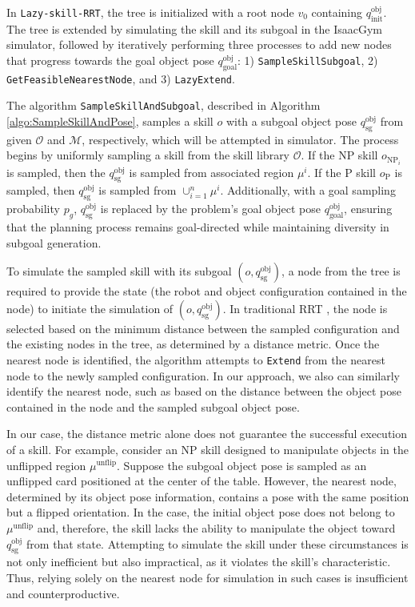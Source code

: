In \texttt{Lazy-skill-RRT}, the tree is initialized with a root node $v_0$ containing $q^\text{obj}_\text{init}$. The tree is extended by simulating the skill and its subgoal in the IsaacGym simulator, followed by iteratively performing three processes to add new nodes that progress towards the goal object pose $q^\text{obj}_\text{goal}$: 1) \texttt{SampleSkillSubgoal}, 2) \texttt{GetFeasibleNearestNode}, and 3) \texttt{LazyExtend}.

The algorithm \texttt{SampleSkillAndSubgoal}, described in Algorithm \ref{algo:SampleSkillAndPose}, samples a skill $o$ with a subgoal object pose $q^{\text{obj}}_{\text{sg}}$ from given $\mathcal{O}$ and $\mathcal{M}$, respectively, which will be attempted in simulator. The process begins by uniformly sampling a skill from the skill library \( \mathcal{O} \). If the NP skill $o_{\text{NP}_i}$ is sampled, then the $q^{\text{obj}}_{\text{sg}}$ is sampled from associated region \( \mu^i \). If the P skill $o_{\text{P}}$ is sampled, then $q^{\text{obj}}_{\text{sg}}$ is sampled from $\cup^n_{i=1} \mu^i$. Additionally, with a goal sampling probability \( p_g \), $q^{\text{obj}}_{\text{sg}}$ is replaced by the problem's goal object pose \( q^{\text{obj}}_{\text{goal}} \), ensuring that the planning process remains goal-directed while maintaining diversity in subgoal generation.

To simulate the sampled skill with its subgoal \((o, q^\text{obj}_\text{sg})\), a node from the tree is required to provide the state (the robot and object configuration contained in the node) to initiate the simulation of \((o, q^\text{obj}_\text{sg})\). In traditional RRT \cite{kuffner2000efficient}, the node is selected based on the minimum distance between the sampled configuration and the existing nodes in the tree, as determined by a distance metric. Once the nearest node is identified, the algorithm attempts to \texttt{Extend} from the nearest node to the newly sampled configuration. In our approach, we also can similarly identify the nearest node, such as based on the distance between the object pose contained in the node and the sampled subgoal object pose. 

In our case, the distance metric alone does not guarantee the successful execution of a skill. For example, consider an NP skill designed to manipulate objects in the unflipped region \( \mu^\text{unflip} \). Suppose the subgoal object pose is sampled as an unflipped card positioned at the center of the table. However, the nearest node, determined by its object pose information, contains a pose with the same position but a flipped orientation. In the case, the initial object pose does not belong to \( \mu^\text{unflip} \) and, therefore, the skill lacks the ability to manipulate the object toward \( q^\text{obj}_\text{sg} \) from that state. Attempting to simulate the skill under these circumstances is not only inefficient but also impractical, as it violates the skill’s characteristic. Thus, relying solely on the nearest node for simulation in such cases is insufficient and counterproductive. 

